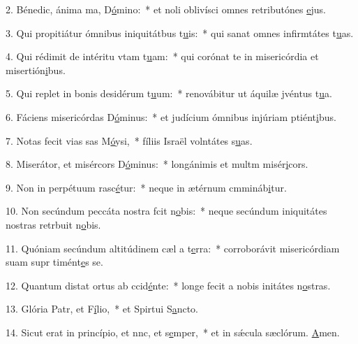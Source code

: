 2. Bénedic, ánima ma, D\uline{ó}mino:~* et noli oblivísci omnes retributónes \uline{e}jus.\par 
3. Qui propitiátur ómnibus iniquitátbus t\uline{u}is:~* qui sanat omnes infirmtátes t\uline{u}as.\par 
4. Qui rédimit de intéritu vtam t\uline{u}am:~* qui corónat te in misericórdia et misertión\uline{i}bus.\par 
5. Qui replet in bonis desidérum t\uline{u}um:~* renovábitur ut áquilæ jvéntus t\uline{u}a.\par 
6. Fáciens misericórdas D\uline{ó}minus:~* et judícium ómnibus injúriam ptiént\uline{i}bus.\par 
7. Notas fecit vias sas M\uline{ó}ysi,~* fíliis Israël volntátes s\uline{u}as.\par 
8. Miserátor, et misércors D\uline{ó}minus:~* longánimis et multm misér\uline{i}cors.\par 
9. Non in perpétuum rasc\uline{é}tur:~* neque in ætérnum cmmináb\uline{i}tur.\par 
10. Non secúndum peccáta nostra fcit n\uline{o}bis:~* neque secúndum iniquitátes nostras retrbuit n\uline{o}bis.\par 
11. Quóniam secúndum altitúdinem cæl a t\uline{e}rra:~* corroborávit misericórdiam suam supr timént\uline{e}s se.\par 
12. Quantum distat ortus ab ccid\uline{é}nte:~* longe fecit a nobis initátes n\uline{o}stras.\par 
13. Glória Patr, et F\uline{í}lio,~* et Spirtui S\uline{a}ncto.\par 
14. Sicut erat in princípio, et nnc, et s\uline{e}mper,~* et in sǽcula sæclórum. \uline{A}men.\par 
